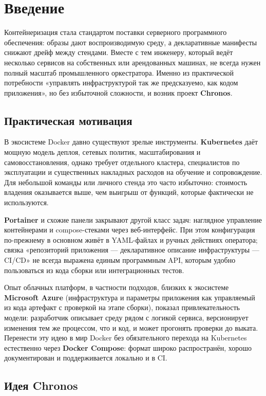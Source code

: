 \section{Введение}

Контейнеризация стала стандартом поставки серверного программного обеспечения: образы дают воспроизводимую среду, а декларативные манифесты снижают дрейф между стендами. Вместе с тем инженеру, который ведёт несколько сервисов на собственных или арендованных машинах, не всегда нужен полный масштаб промышленного оркестратора. Именно из практической потребности «управлять инфраструктурой так же предсказуемо, как кодом приложения», но без избыточной сложности, и возник проект \textbf{Chronos}.

\subsection{Практическая мотивация}

В экосистеме Docker давно существуют зрелые инструменты. \textbf{Kubernetes} даёт мощную модель деплоя, сетевых политик, масштабирования и самовосстановления, однако требует отдельного кластера, специалистов по эксплуатации и существенных накладных расходов на обучение и сопровождение. Для небольшой команды или личного стенда это часто избыточно: стоимость владения оказывается выше, чем выигрыш от функций, которые фактически не используются.

\textbf{Portainer} и схожие панели закрывают другой класс задач: наглядное управление контейнерами и compose-стеками через веб-интерфейс. При этом конфигурация по-прежнему в основном живёт в YAML-файлах и ручных действиях оператора; связка «репозиторий приложения --- декларативное описание инфраструктуры --- CI/CD» не всегда выражена единым программным API, которым удобно пользоваться из кода сборки или интеграционных тестов.

Опыт облачных платформ, в частности подходов, близких к экосистеме \textbf{Microsoft Azure} (инфраструктура и параметры приложения как управляемый из кода артефакт с проверкой на этапе сборки), показал привлекательность модели: разработчик описывает среду рядом с логикой сервиса, версионирует изменения тем же процессом, что и код, и может прогонять проверки до выката. Перенести эту идею в мир Docker без обязательного перехода на Kubernetes естественно через \textbf{Docker Compose}: формат широко распространён, хорошо документирован и поддерживается локально и в CI.

\subsection{Идея Chronos}

